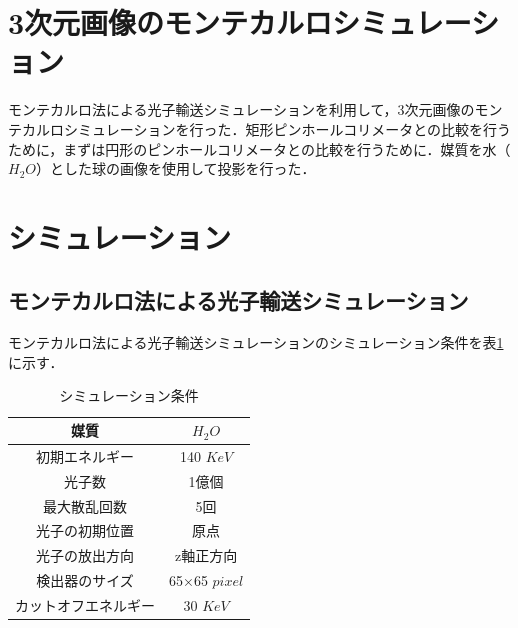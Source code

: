 \documentclass[dvipdfmx,autodetect-engine,twocolumn,10pt]{jsarticle}%
\begin{document}
\section{3次元画像のモンテカルロシミュレーション}
モンテカルロ法による光子輸送シミュレーションを利用して，3次元画像のモンテカルロシミュレーションを行った．矩形ピンホールコリメータとの比較を行うために，まずは円形のピンホールコリメータとの比較を行うために．媒質を水（$H_2O$）とした球の画像を使用して投影を行った．

\section{シミュレーション}
\subsection{モンテカルロ法による光子輸送シミュレーション}
モンテカルロ法による光子輸送シミュレーションのシミュレーション条件を表\ref{simu_cond}に示す．
\begin{table}[htbp]
  \begin{center}
    \caption{シミュレーション条件}
    \label{simu_cond}
    \begin{tabular}{|c|c|} \hline
      媒質 & $H_2O$ \\ \hline
      初期エネルギー & 140 $KeV$ \\ \hline
      光子数 & 1億個 \\ \hline
      最大散乱回数 & 5回 \\ \hline
      光子の初期位置 & 原点 \\ \hline
      光子の放出方向 & z軸正方向 \\ \hline
      検出器のサイズ & 65×65 $pixel$ \\ \hline
      カットオフエネルギー & 30 $KeV$ \\ \hline
    \end{tabular}
  \end{center}
\end{table}
\end{document}
